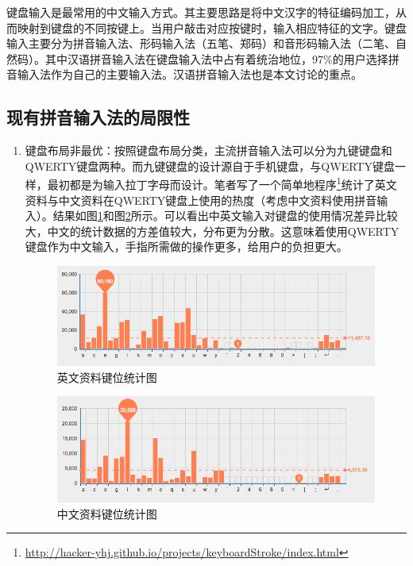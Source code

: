   键盘输入是最常用的中文输入方式。其主要思路是将中文汉字的特征编码加工，从而映射到键盘的不同按键上。当用户敲击对应按键时，输入相应特征的文字。键盘输入主要分为拼音输入法、形码输入法（五笔、郑码）和音形码输入法（二笔、自然码）。\supercite{wgy, dsl}其中汉语拼音输入法在键盘输入法中占有着统治地位，97\%的用户选择拼音输入法作为自己的主要输入法。\supercite{chen}汉语拼音输入法也是本文讨论的重点。

  \subsection{现有拼音输入法的局限性\label{sec:limit}}

  \begin{enumerate}

  \item
  键盘布局非最优：按照键盘布局分类，主流拼音输入法可以分为九键键盘和QWERTY键盘两种。而九键键盘的设计源自于手机键盘，与QWERTY键盘一样，最初都是为输入拉丁字母而设计。笔者写了一个简单地程序\footnote{\url{http://hacker-yhj.github.io/projects/keyboardStroke/index.html}}统计了英文资料与中文资料在QWERTY键盘上使用的热度（考虑中文资料使用拼音输入）。结果如图\ref{fig:stats_en}和图\ref{fig:stats_cn}所示。可以看出中英文输入对键盘的使用情况差异比较大，中文的统计数据的方差值较大，分布更为分散。这意味着使用QWERTY键盘作为中文输入，手指所需做的操作更多，给用户的负担更大。

  \begin{figure}[h]
  \noindent\includegraphics[width=150mm]{img/stats_en}
  \caption{英文资料键位统计图}
  \label{fig:stats_en}
  \end{figure}

  \begin{figure}[h]
  \noindent\includegraphics[width=150mm]{img/stats_cn}
  \caption{中文资料键位统计图}
  \label{fig:stats_cn}
  \end{figure}


\end{enumerate}
